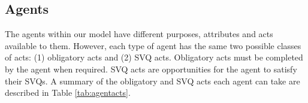 \documentclass{scspaperproc}
\theoremstyle{scsthe}
\begin{document}

\subsection{Agents} 
The agents within our model have different purposes, attributes and acts available to them. However, each type of agent has the same two possible classes of acts: (1) obligatory acts and (2) SVQ acts. Obligatory acts must be completed by the agent when required. SVQ acts are opportunities for the agent to satisfy their SVQs. A summary of the obligatory and SVQ acts each agent can take are described in Table \ref{tab:agentacts}.
\end{document}
